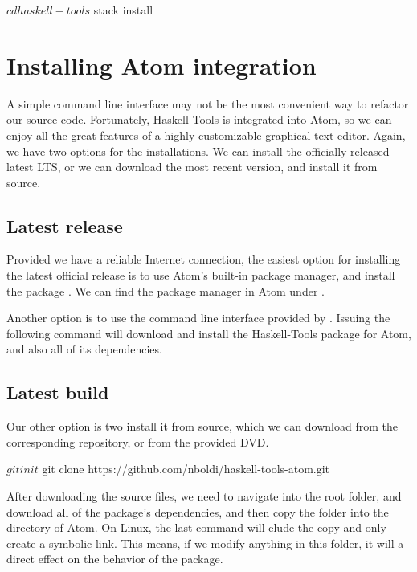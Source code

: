 \documentclass[main.tex]{subfiles}
\begin{document}
	\begin{bash}
		$ cd haskell-tools
		$ stack install
	\end{bash}
	
	\section{Installing Atom integration}
	
	A simple command line interface may not be the most convenient way to refactor our source code. Fortunately, Haskell-Tools is integrated into Atom, so we can enjoy all the great features of a highly-customizable graphical text editor. Again, we have two options for the installations. We can install the officially released latest LTS, or we can download the most recent version, and install it from source.
	
	\subsection{Latest release}
	
	Provided we have a reliable Internet connection, the easiest option for installing the latest official release is to use Atom's built-in package manager, and install the package . We can find the package manager in Atom under .
	
	Another option is to use the command line interface provided by . Issuing the following command will download and install the Haskell-Tools package for Atom, and also all of its dependencies.
	
	
	\subsection{Latest build}
	
	Our other option is two install it from source, which we can download from the corresponding repository, or from the provided DVD.
	
	\begin{bash}
		$ git init
		$ git clone https://github.com/nboldi/haskell-tools-atom.git
	\end{bash}
	
	After downloading the source files, we need to navigate into the root folder, and download all of the package's dependencies, and then copy the folder into the  directory of Atom. On Linux, the last command will elude the copy and only create a symbolic link. This means, if we modify anything in this folder, it will a direct effect on the behavior of the package.
	
\end{document}
